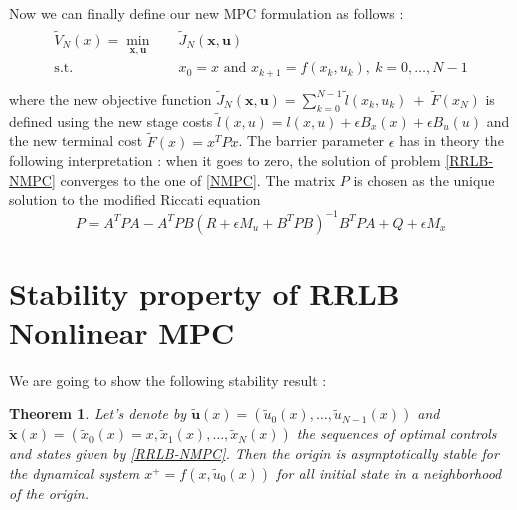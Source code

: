 \documentclass[12pt]{article}
\newtheorem{theorem}{Theorem}[section]
\theoremstyle{definition}
\theoremstyle{remark}
\newcommand{\inv}[1]{#1^{-1}}
\begin{document}
\newpage
Now we can finally define our new MPC formulation as follows :
\begin{align}
	\begin{split}\label{RRLB-NMPC}
		\tilde{V}_N(x)=\underset{\mathbf{x},\mathbf{u}}{\min} &\quad \tilde{J}_N(\mathbf{x},\mathbf{u})\\
		\text{s.t.} &\quad x_0=x\text{ and }x_{k+1}=f(x_k,u_k),~k=0,\dots,N-1\\
	\end{split}
\end{align}
where the new objective function $\tilde{J}_N(\mathbf{x},\mathbf{u})=\sum_{k=0}^{N-1}\tilde{l}(x_k,u_k)~+~\tilde{F}(x_N)$ is defined using the new stage costs $\tilde{l}(x,u)=l(x,u)+\epsilon B_x(x)+\epsilon B_u(u)$ and the new terminal cost $\tilde{F}(x)=x^TPx$.
The barrier parameter $\epsilon$ has in theory the following interpretation : when it goes to zero, the solution of problem \ref{RRLB-NMPC} converges to the one of \ref{NMPC}.
The matrix $P$ is chosen as the unique solution to the modified Riccati equation 
\begin{equation}
	\label{Riccati}
	P=A^TPA-A^TPB\inv{(R+\epsilon M_u+B^TPB)}B^TPA+Q+\epsilon M_x
\end{equation}

\section{Stability property of RRLB Nonlinear MPC}
We are going to show the following stability result :
\begin{theorem}
	Let's denote by $\tilde{\mathbf{u}}(x)=(\tilde{u}_0(x),\dots,\tilde{u}_{N-1}(x))$ and $\tilde{\mathbf{x}}(x)=(\tilde{x}_0(x)=x,\tilde{x}_1(x),\dots,\tilde{x}_N(x))$ the sequences of optimal controls and states given by \ref{RRLB-NMPC}.
	Then the origin is asymptotically stable for the dynamical system $x^+=f(x,\tilde{u}_0(x))$ for all initial state in a neighborhood of the origin.
\end{theorem}
\end{document}
